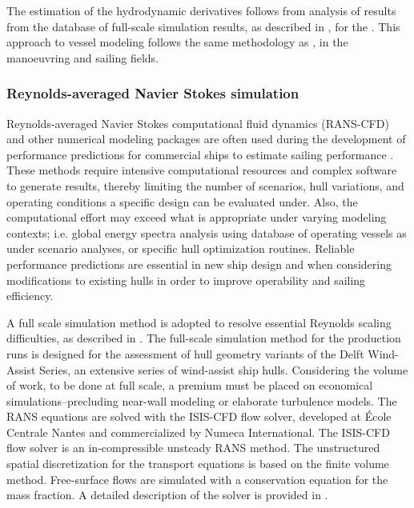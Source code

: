 \documentclass[twoside,twocolumn]{article}
\begin{document}
	The estimation of the hydrodynamic derivatives follows from analysis of results from the database of full-scale simulation results, as described in \cite{Kolk18c,Kolk19d}, for the \DWA. This approach to vessel modeling follows the same methodology as \citet{Tsakonas1959,Jacobs1966,Inoue1981,Keuning1998,Tox11}, in the manoeuvring and sailing fields.
	
	\subsubsection{Reynolds-averaged Navier Stokes simulation}
	
	Reynolds-averaged Navier Stokes computational fluid dynamics (RANS-CFD) and other numerical modeling packages are often used during the development of performance predictions for commercial ships to estimate sailing performance \citep{Tezdogan2015,Eggers16,Kolk18c}. These methods require intensive computational resources and complex software to generate results, thereby limiting the number of scenarios, hull variations, and operating conditions a specific design can be evaluated under. Also, the computational effort may exceed what is appropriate under varying modeling contexts; i.e. global energy spectra analysis using database of operating vessels as under scenario analyses, or specific hull optimization routines. Reliable performance predictions are essential in new ship design and when considering modifications to existing hulls in order to improve operability and sailing efficiency. 
	
	A full scale simulation method is adopted to resolve essential Reynolds scaling difficulties, as described in \cite{Kolk19d}. The full-scale simulation method for the production runs is designed for the assessment of hull geometry variants of the Delft Wind-Assist Series, an extensive series of wind-assist ship hulls. Considering the volume of work, to be done at full scale, a premium must be placed on economical simulations--precluding near-wall modeling or elaborate turbulence models. The RANS equations are solved with the ISIS-CFD flow solver, developed at \'{E}cole Centrale Nantes and commercialized by Numeca International. The ISIS-CFD flow solver is an in-compressible unsteady RANS method. The unstructured spatial discretization for the transport equations is based on the finite volume method. Free-surface flows are simulated with a conservation equation for the mass fraction. A detailed description of the solver is provided in \cite{Den05,Den06,Que07,Duv03}.
	
\end{document}
